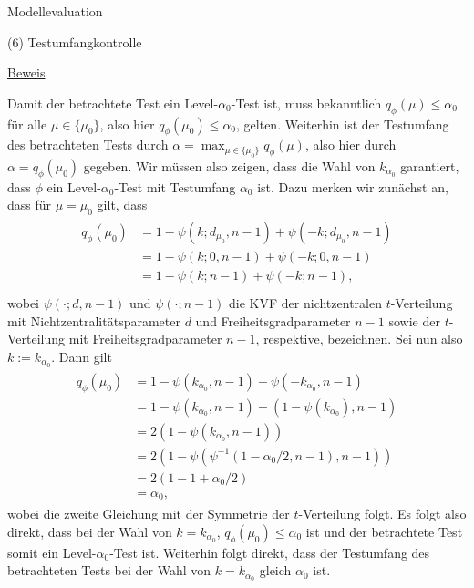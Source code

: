 \documentclass[
  8pt,
  ignorenonframetext,
]{beamer}
\begin{document}
\begin{frame}{Modellevaluation}
\protect\hypertarget{modellevaluation-12}{}

\noindent (6) Testumfangkontrolle 

\footnotesize

\underline{Beweis}

Damit der betrachtete Test ein Level-\(\alpha_0\)-Test ist, muss
bekanntlich \(q_\phi(\mu) \le \alpha_0\) für alle \(\mu \in \{\mu_0\}\),
also hier \(q_\phi(\mu_0) \le \alpha_0\), gelten. Weiterhin ist der
Testumfang des betrachteten Tests durch
\(\alpha = \max_{\mu \in \{\mu_0\}} q_\phi(\mu)\), also hier durch
\(\alpha = q_\phi(\mu_0)\) gegeben. Wir müssen also zeigen, dass die
Wahl von \(k_{\alpha_0}\) garantiert, dass \(\phi\) ein
Level-\(\alpha_0\)-Test mit Testumfang \(\alpha_0\) ist. Dazu merken wir
zunächst an, dass für \(\mu = \mu_0\) gilt, dass \begin{align}
\begin{split}
q_\phi(\mu_0)
& =  1 - \psi(k;d_{\mu_0},n-1) + \psi(-k;d_{\mu_0},n-1)                          \\
& =  1 - \psi(k;0,n-1) + \psi(-k;0,n-1)                                          \\
& =  1 - \psi(k;n-1) + \psi(-k;n-1),                                             \\
\end{split}
\end{align} wobei \(\psi(\cdot;d,n-1)\) und \(\psi(\cdot;n-1)\) die KVF
der nichtzentralen \(t\)-Verteilung mit Nichtzentralitätsparameter \(d\)
und Freiheitsgradparameter \(n-1\) sowie der \(t\)-Verteilung mit
Freiheitsgradparameter \(n-1\), respektive, bezeichnen. Sei nun also
\(k := k_{\alpha_0}\). Dann gilt \begin{align}
\begin{split}
q_\phi(\mu_0)
& = 1 - \psi(k_{\alpha_0}, n-1) + \psi(-k_{\alpha_0}, n-1)                                 \\
& = 1 - \psi(k_{\alpha_0}, n-1) + (1 - \psi(k_{\alpha_0}), n-1)                            \\
& = 2(1-\psi(k_{\alpha_0}, n-1))                                                      \\
& = 2\left(1-\psi\left(\psi^{-1}\left(1 - \alpha_0/2 , n-1\right), n-1\right)\right) \\
& = 2\left(1 - 1 + \alpha_0/2\right)                          \\
& = \alpha_0,
\end{split}
\end{align} wobei die zweite Gleichung mit der Symmetrie der
\(t\)-Verteilung folgt. Es folgt also direkt, dass bei der Wahl von
\(k = k_{\alpha_0}\), \(q_\phi(\mu_0)\le \alpha_0\) ist und der
betrachtete Test somit ein Level-\(\alpha_0\)-Test ist. Weiterhin folgt
direkt, dass der Testumfang des betrachteten Tests bei der Wahl von
\(k = k_{\alpha_0}\) gleich \(\alpha_0\) ist.
\end{frame}
\end{document}
